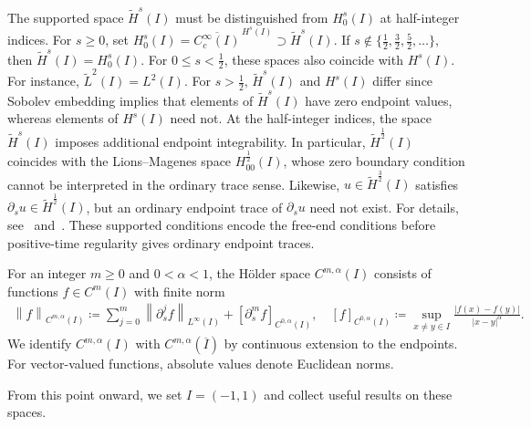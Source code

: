 \documentclass[11pt,reqno]{amsart}
\theoremstyle{plain}
\newtheorem{corollary}[theorem]{Corollary}
\theoremstyle{definition}
\numberwithin{equation}{section}
\newcommand{\p}{\partial}
\newcommand{\wt}[1]{\widetilde{#1}}
\newcommand{\abs}[1]{\left\lvert #1 \right\rvert}
\newcommand{\norm}[1]{\left\lVert #1 \right\rVert}
\newcommand{\R}{\mathbb{R}}
\newcommand{\ci}[1]{C^{#1}(I)}
\newcommand{\thi}[1]{\wt H^{#1}(I)}
\begin{document}
The supported space $\wt H^s(I)$ must be distinguished from $H_0^s(I)$ at half-integer indices.
For $s\ge0$, set
$H_0^s(I)=\overline{C_c^\infty(I)}^{\,H^s(I)} \supset \wt H^s(I)$. If $s\notin\{\frac12,\frac32,\frac52,\ldots\}$, then $\wt H^s(I) = H_0^s(I)$.
For $0\le s<\frac12$, these spaces also coincide with $H^s(I)$. For instance, $\wt L^2(I) = L^2(I)$.
For $s>\frac12$, $\wt H^s(I)$ and $H^s(I)$ differ since Sobolev embedding implies that elements of
$\wt H^s(I)$ have zero endpoint values, whereas elements of $H^s(I)$ need not.
At the half-integer indices, the space $\wt H^s(I)$ imposes additional
endpoint integrability. In particular, $\wt H^{\frac12}(I)$ coincides
with the Lions--Magenes space $H_{00}^{\frac12}(I)$, whose zero boundary
condition cannot be interpreted in the ordinary trace sense.
Likewise, $u\in\wt H^{\frac32}(I)$ satisfies
$\p_su\in\wt H^{\frac12}(I)$, but an ordinary endpoint trace of
$\p_su$ need not exist. For details, see~\cite[Chapter~3]{McLean2000}
and~\cite[Chapter~33]{Tartar2007}.
These supported conditions encode the free-end conditions before
positive-time regularity gives ordinary endpoint traces.

For an integer $m\ge0$ and $0<\alpha<1$, the H\"older space
$\ci{m,\alpha}$ consists of functions $f\in\ci{m}$ with finite norm
\begin{align*}
    \norm{f}_{\ci{m,\alpha}}
    \coloneqq\sum_{j=0}^{m}\norm{\p_s^j f}_{L^\infty(I)}
        +[\p_s^m f]_{\ci{0,\alpha}}, \quad 
    [f]_{\ci{0,\alpha}}
    \coloneqq\sup_{x\ne y\in I}
        \frac{\abs{f(x)-f(y)}}{\abs{x-y}^{\alpha}}.
\end{align*}
We identify $\ci{m,\alpha}$ with $C^{m,\alpha}(\overline I)$ by
continuous extension to the endpoints. For vector-valued functions,
absolute values denote Euclidean norms.

From this point onward, we set $I=(-1,1)$ and collect useful results on these spaces.

\end{document}
